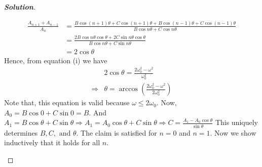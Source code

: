\documentclass[10pt]{scrartcl}
\theoremstyle{definition}
\newenvironment{solution} {\begin{proof}[\normalfont \textbf{Solution}]} {\end{proof}}
\begin{document}
\begin{solution}
\begin{enumerate}[label={(\alph*)}]
\begin{align*}
                \frac{A_{n+1} + A_{n-1}}{A_n} &= \frac{B\cos{(n+1)\theta} + C\cos{(n+1)\theta}+B\cos{(n-1)\theta} + C\cos{(n-1)\theta}}{B\cos{n\theta} + C\cos{n\theta}} \\ 
                                              &=\frac{2B\cos{n\theta}\cos{\theta} + 2C\sin{n\theta}\cos{\theta}}{B\cos{n\theta} + C\sin{n\theta}} \\ 
                                              &=2\cos\theta \tag{ii}
            \end{align*}
            Hence, from equation (i) we have 
            \begin{align*}
                &2\cos\theta = \frac{2\omega_0^2 - \omega^2}{\omega_0^2} \\ 
                \Rightarrow  &\theta = \arccos\left(\frac{2\omega_0^2 - \omega^2}{2\omega_0^2}\right) \tag{iii}
            \end{align*}
            Note that, this equation is valid because $\omega \leq 2\omega_0$.
            Now, $A_0 = B\cos0 + C\sin0 = B$. And $A_1 = B\cos\theta + C\sin\theta \Rightarrow A_1 = A_0\cos\theta + C\sin\theta \Rightarrow C = \frac{A_1 - A_0\cos\theta}{\sin\theta}$
            This uniquely determines $B, C, \text{ and } \theta$. The claim is satisfied for $n=0$ and $n=1$. Now we show inductively that it holds for all $n$.


\end{enumerate}
\end{solution}
\end{document}
